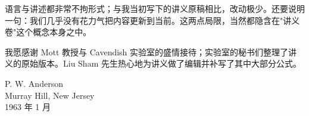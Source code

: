 语言与讲述都非常不拘形式；与我当初写下的讲义原稿相比，改动极少。还要说明一句：我们几乎没有花力气把内容更新到当前。这两点局限，当然都隐含在"讲义卷"这个概念本身之中。

我愿感谢 Mott 教授与 Cavendish 实验室的盛情接待；实验室的秘书们整理了讲义的原始版本。Liu Sham 先生热心地为讲义做了编辑并补写了其中大部分公式。

\begin{flushright}
P. W. Anderson\\
Murray Hill, New Jersey\\
1963 年 1 月
\end{flushright}
